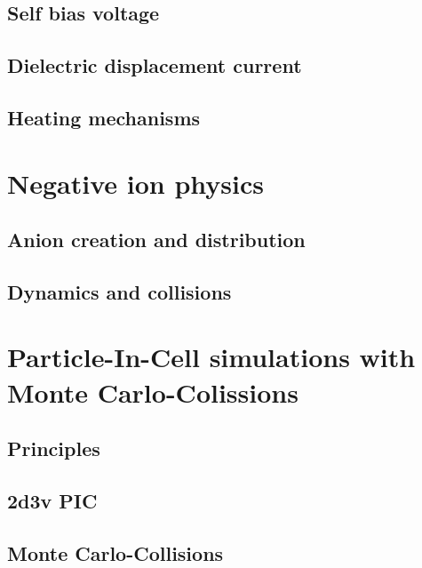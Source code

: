 		\subsection{Self bias voltage}\label{subsec:selfbias}

    \subsection{Dielectric displacement current}\label{subsec:displacementcurrent}

		\subsection{Heating mechanisms}\label{subsec:heating}

  \section{Negative ion physics}

    \subsection{Anion creation and distribution}

    \subsection{Dynamics and collisions}

  \section{Particle-In-Cell simulations with Monte Carlo-Colissions}

    \subsection{Principles}

    \subsection{2d3v PIC}

    \subsection{Monte Carlo-Collisions}
